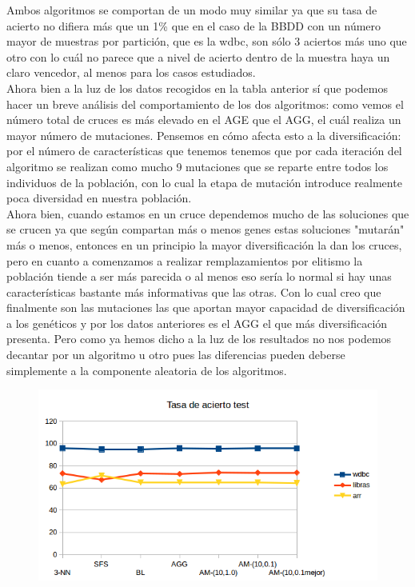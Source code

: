\documentclass[10pt,a4paper]{article}
\begin{document}
Ambos algoritmos se comportan de un modo muy similar ya que su tasa de acierto no difiera más que un 1\% que en el caso de la BBDD con un número mayor de muestras por partición, que es la wdbc, son sólo 3 aciertos más uno que otro con lo cuál no parece que a nivel de acierto dentro de la muestra haya un claro vencedor, al menos para los casos estudiados.\\

Ahora bien a la luz de los datos recogidos en la tabla anterior sí que podemos hacer un breve análisis del comportamiento de los dos algoritmos: como vemos el número total de cruces es más elevado en el AGE que el AGG, el cuál realiza un mayor número de mutaciones. Pensemos en cómo afecta esto a la diversificación: por el número de características que tenemos tenemos que por cada iteración del algoritmo se realizan como mucho 9 mutaciones que se reparte entre todos los individuos de la población, con lo cual la etapa de mutación introduce realmente poca diversidad en nuestra población.\\

Ahora bien, cuando estamos en un cruce dependemos mucho de las soluciones que se crucen ya que según compartan más o menos genes estas soluciones "mutarán" más o menos, entonces en un principio la mayor diversificación la dan los cruces, pero en cuanto a comenzamos a realizar remplazamientos por elitismo la población tiende a ser más parecida o al menos eso sería lo normal si hay unas características bastante más informativas que las otras. Con lo cual creo que finalmente son las mutaciones las que aportan mayor capacidad de diversificación a los genéticos y por los datos anteriores es el AGG el que más diversificación presenta. Pero como ya hemos dicho a la luz de los resultados no nos podemos decantar por un algoritmo u otro pues las diferencias pueden deberse simplemente a la componente aleatoria de los algoritmos.\\

\begin{figure}[H]
\centering
\includegraphics[width=130mm]{tasa_test_am.png}
\end{figure}
\end{document}

